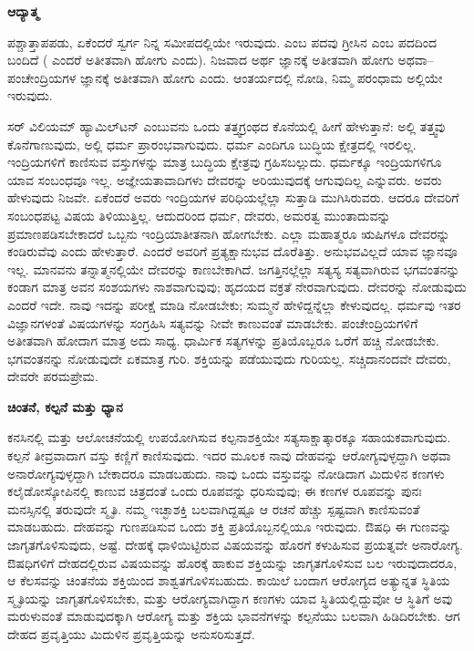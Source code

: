 \centerline{\textbf{ಆದ್ಯಾತ್ಮ}}

ಪಶ್ಚಾತ್ತಾಪಪಡು, ಏಕೆಂದರೆ ಸ್ವರ್ಗ ನಿನ್ನ ಸಮೀಪದಲ್ಲಿಯೇ ಇರುವುದು.  ಎಂಬ ಪದವು ಗ್ರೀಸಿನ  ಎಂಬ ಪದದಿಂದ ಬಂದಿದೆ ( ಎಂದರೆ ಅತೀತವಾಗಿ ಹೋಗು ಎಂದು). ನಿಜವಾದ ಅರ್ಥ ಜ್ಞಾನಕ್ಕೆ ಅತೀತವಾಗಿ ಹೋಗು ಅಥವಾ–ಪಂಚೇಂದ್ರಿಯಗಳ ಜ್ಞಾನಕ್ಕೆ ಅತೀತವಾಗಿ ಹೋಗು ಎಂದು. ಆಂತರ್ಯದಲ್ಲಿ ನೋಡಿ, ನಿಮ್ಮ ಪರಂಧಾಮ ಅಲ್ಲಿಯೇ ಇರುವುದು.

\vskip 0.2cm

ಸರ್​ ವಿಲಿಯಮ್​ ಹ್ಯಾಮಿಲ್​ಟನ್​ ಎಂಬುವನು ಒಂದು ತತ್ತ್ವಗ್ರಂಥದ ಕೊನೆಯಲ್ಲಿ ಹೀಗೆ ಹೇಳುತ್ತಾನೆ: ಅಲ್ಲಿ ತತ್ತ್ವವು ಕೊನೆಗಾಣುವುದು, ಅಲ್ಲಿ ಧರ್ಮ ಪ್ರಾರಂಭವಾಗುವುದು. ಧರ್ಮ ಎಂದಿಗೂ ಬುದ್ಧಿಯ ಕ್ಷೇತ್ರದಲ್ಲಿ ಇರಲಿಲ್ಲ. ಇಂದ್ರಿಯಗಳಿಗೆ ಕಾಣಿಸುವ ವಸ್ತುಗಳನ್ನು ಮಾತ್ರ ಬುದ್ಧಿಯ ಕ್ಷೇತ್ರವು ಗ್ರಹಿಸಬಲ್ಲುದು. ಧರ್ಮಕ್ಕೂ ಇಂದ್ರಿಯಗಳಿಗೂ ಯಾವ ಸಂಬಂಧವೂ ಇಲ್ಲ. ಅಜ್ಞೇಯತಾವಾದಿಗಳು ದೇವರನ್ನು ಅರಿಯುವುದಕ್ಕೆ ಆಗುವುದಿಲ್ಲ ಎನ್ನುವರು. ಅವರು ಹೇಳುವುದು ನಿಜವೇ. ಏಕೆಂದರೆ ಅವರು ಇಂದ್ರಿಯಗಳ ಪರಿಧಿಯಲ್ಲೆಲ್ಲಾ ಸುತ್ತಾಡಿ ಮುಗಿಸಿರುವರು. ಆದರೂ ದೇವರಿಗೆ ಸಂಬಂಧಪಟ್ಟ ವಿಷಯ ತಿಳಿಯುತ್ತಿಲ್ಲ. ಆದುದರಿಂದ ಧರ್ಮ, ದೇವರು, ಅಮರತ್ವ ಮುಂತಾದುವನ್ನು ಪ್ರಮಾಣಪಡಿಸಬೇಕಾದರೆ ಒಬ್ಬನು ಇಂದ್ರಿಯಾತೀತನಾಗಿ ಹೋಗಬೇಕು. ಎಲ್ಲಾ ಮಹಾತ್ಮರೂ ಋಷಿಗಳೂ ದೇವರನ್ನು ಕಂಡಿರುವೆವು ಎಂದು ಹೇಳುತ್ತಾರೆ. ಎಂದರೆ ಅವರಿಗೆ ಪ್ರತ್ಯಕ್ಷಾನುಭವ ದೊರೆತಿತ್ತು. ಅನುಭವವಿಲ್ಲದೆ ಯಾವ ಜ್ಞಾನವೂ ಇಲ್ಲ. ಮಾನವನು ತನ್ನಾತ್ಮನಲ್ಲಿಯೇ ದೇವರನ್ನು ಕಾಣಬೇಕಾಗಿದೆ. ಜಗತ್ತಿನಲ್ಲೆಲ್ಲಾ ಸತ್ಯಸ್ಯ ಸತ್ಯವಾಗಿರುವ ಭಗವಂತನನ್ನು ಕಂಡಾಗ ಮಾತ್ರ ಅವನ ಸಂಶಯಗಳು ನಾಶವಾಗುವುವು; ಹೃದಯದ ವಕ್ರತೆ ನೇರವಾಗುವುದು. ದೇವರನ್ನು ನೋಡುವುದು ಎಂದರೆ ಇದೇ. ನಾವು ಇದನ್ನು ಪರೀಕ್ಷೆ ಮಾಡಿ ನೋಡಬೇಕು; ಸುಮ್ಮನೆ ಹೇಳಿದ್ದನ್ನೆಲ್ಲಾ ಕೇಳುವುದಲ್ಲ. ಧರ್ಮವು ಇತರ ವಿಜ್ಞಾನಗಳಂತೆ ವಿಷಯಗಳನ್ನು ಸಂಗ್ರಹಿಸಿ ಸತ್ಯವನ್ನು ನೀವೇ ಕಾಣುವಂತೆ ಮಾಡಬೇಕು. ಪಂಚೇಂದ್ರಿಯಗಳಿಗೆ ಅತೀತವಾಗಿ ಹೋದಾಗ ಮಾತ್ರ ಅದು ಸಾಧ್ಯ. ಧಾರ್ಮಿಕ ಸತ್ಯಗಳನ್ನು ಪ್ರತಿಯೊಬ್ಬರೂ ಒರೆಗೆ ಹಚ್ಚಿ ನೋಡಬೇಕು. ಭಗವಂತನನ್ನು ನೋಡುವುದೇ ಏಕಮಾತ್ರ ಗುರಿ. ಶಕ್ತಿಯನ್ನು ಪಡೆಯುವುದು ಗುರಿಯಲ್ಲ. ಸಚ್ಚಿದಾನಂದವೇ ದೇವರು, ದೇವರೇ ಪರಮಪ್ರೇಮ.

\centerline{\textbf{ಚಿಂತನೆ, ಕಲ್ಪನೆ ಮತ್ತು ಧ್ಯಾನ}}

ಕನಸಿನಲ್ಲಿ ಮತ್ತು ಆಲೋಚನೆಯಲ್ಲಿ ಉಪಯೋಗಿಸುವ ಕಲ್ಪನಾಶಕ್ತಿಯೇ ಸತ್ಯ\break ಸಾಕ್ಷಾತ್ಕಾರಕ್ಕೂ ಸಹಾಯಕವಾಗುವುದು. ಕಲ್ಪನೆ ತೀವ್ರವಾದಾಗ ವಸ್ತು ಕಣ್ಣಿಗೆ ಕಾಣಿಸುವುದು. ಇದರ ಮೂಲಕ ನಾವು ದೇಹವನ್ನು ಆರೋಗ್ಯವುಳ್ಳದ್ದಾಗಿ ಅಥವಾ ಅನಾರೋಗ್ಯವುಳ್ಳದ್ದಾಗಿ ಬೇಕಾದರೂ ಮಾಡಬಹುದು. ನಾವು ಒಂದು ವಸ್ತುವನ್ನು ನೋಡಿದಾಗ ಮಿದುಳಿನ ಕಣಗಳು ಕಲೈಡೋಸ್ಕೋಪಿನಲ್ಲಿ ಕಾಣುವ ಚಿತ್ರದಂತೆ ಒಂದು ರೂಪವನ್ನು ಧರಿಸುವುವು; ಈ ಕಣಗಳ ರೂಪವನ್ನು ಪುನಃ ಮನಸ್ಸಿನಲ್ಲಿ ತರುವುದೇ ಸ್ಮೃತಿ. ನಮ್ಮ ಇಚ್ಛಾಶಕ್ತಿ ಬಲವಾಗಿದ್ದಷ್ಟೂ ಆ ರಚನೆ ಹೆಚ್ಚು ಸ್ಪಷ್ಟವಾಗಿ ಕಾಣಿಸುವಂತೆ ಮಾಡಬಹುದು. ದೇಹವನ್ನು ಗುಣಪಡಿಸುವ ಒಂದು ಶಕ್ತಿ ಪ್ರತಿಯೊಬ್ಬನಲ್ಲಿಯೂ ಇರುವುದು. ಔಷಧಿ ಈ ಗುಣವನ್ನು ಜಾಗೃತಗೊಳಿಸುವುದು, ಅಷ್ಟೆ. ದೇಹಕ್ಕೆ ಧಾಳಿಯಿಟ್ಟಿರುವ ವಿಷಯವನ್ನು ಹೊರಗೆ ಕಳುಹಿಸುವ ಪ್ರಯತ್ನವೇ ಅನಾರೋಗ್ಯ. ಔಷಧಿಗಳಿಗೆ ದೇಹದಲ್ಲಿರುವ ವಿಷಯವನ್ನು ಹೊರಕ್ಕೆ ಹಾಕುವ ಶಕ್ತಿಯನ್ನು ಜಾಗೃತಗೊಳಿಸುವ ಬಲ ಇರುವುದಾದರೂ, ಆ ಕೆಲಸವನ್ನು ಚಿಂತನೆಯ ಶಕ್ತಿಯಿಂದ ಶಾಶ್ವತಗೊಳಿಸಬಹುದು. ಕಾಯಿಲೆ ಬಂದಾಗ ಆರೋಗ್ಯದ ಅತ್ಯುನ್ನತ ಸ್ಥಿತಿಯ ಸ್ಮೃತಿಯನ್ನು ಜಾಗೃತಗೊಳಿಸಬೇಕು, ಮತ್ತು ಆರೋಗ್ಯವಾಗಿದ್ದಾಗ ಕಣಗಳು ಯಾವ ಸ್ಥಿತಿಯಲ್ಲಿದ್ದುವೋ ಆ ಸ್ಥಿತಿಗೆ ಅವು ಮರುಳುವಂತೆ ಮಾಡುವುದಕ್ಕಾಗಿ ಆರೋಗ್ಯ ಮತ್ತು ಶಕ್ತಿಯ ಭಾವನೆಗಳನ್ನು ಕಲ್ಪನೆಯು ಬಲವಾಗಿ ಹಿಡಿದಿರಬೇಕು. ಆಗ ದೇಹದ ಪ್ರವೃತ್ತಿಯು ಮಿದುಳಿನ ಪ್ರವೃತ್ತಿಯನ್ನು ಅನುಸರಿಸುತ್ತದೆ.

